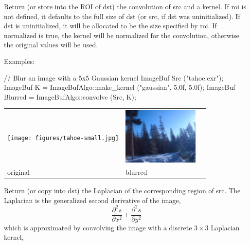  

Return (or store into the ROI of {\cf dst}) the convolution of {\cf src} and
a kernel.  If {\cf roi} is not defined, it defaults to the full size of
{\cf dst} (or {\cf src}, if {\cf dst} was uninitialized). If {\cf dst} is
uninitialized, it will be allocated to be the size specified by {\cf roi}.
If {\cf normalized} is {\cf true}, the kernel will be normalized for the
convolution, otherwise the original values will be used.

\smallskip
\noindent Examples:
\begin{code}
    // Blur an image with a 5x5 Gaussian kernel
    ImageBuf Src ("tahoe.exr");
    ImageBuf K = ImageBufAlgo::make_kernel ("gaussian", 5.0f, 5.0f);
    ImageBuf Blurred = ImageBufAlgo::convolve (Src, K);
\end{code}

\spc \begin{tabular}{lll}
\texttt{[image: figures/tahoe-small.jpg]} &
\includegraphics[width=1.5in]{figures/tahoe-blur.jpg} \\
original & blurred \\
\end{tabular}
\apiend


 
Return (or copy into {\cf dst}) the Laplacian of the corresponding
region of {\cf src}. The Laplacian is the generalized second derivative
of the image,
$$\frac{\partial^2 s}{\partial x^2} + \frac{\partial^2 s}{\partial y^2}$$
which is approximated by convolving the image with a discrete $3 \times 3$
Laplacian kernel,

